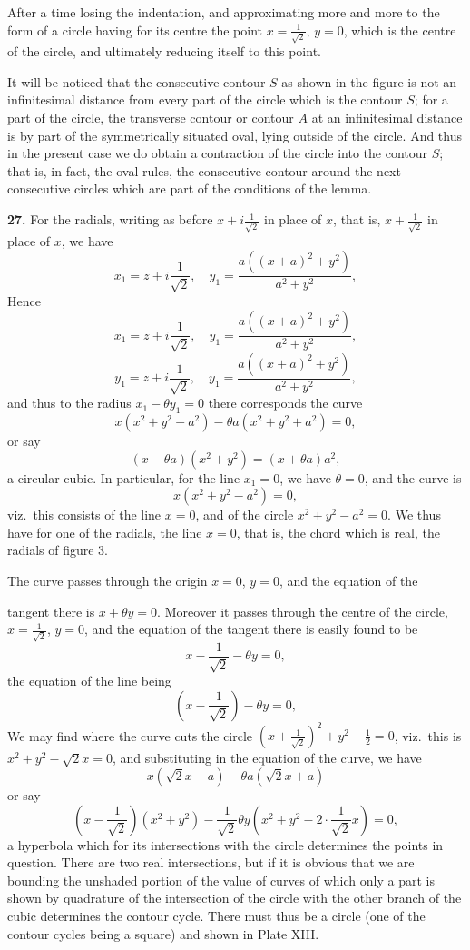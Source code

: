 \documentclass[11pt,a4paper]{article}
\begin{document}
After a time losing the indentation, and approximating more and more to the form of a circle having for its centre the point $x = \frac{1}{\sqrt{2}}$, $y = 0$, which is the centre of the circle, and ultimately reducing itself to this point.

It will be noticed that the consecutive contour $S$ as shown in the figure is not an infinitesimal distance from every part of the circle which is the contour $S$; for a part of the circle, the transverse contour or contour $A$ at an infinitesimal distance is by part of the symmetrically situated oval, lying outside of the circle. And thus in the present case we do obtain a contraction of the circle into the contour $S$; that is, in fact, the oval rules, the consecutive contour around the next consecutive circles which are part of the conditions of the lemma.

\textbf{27.} For the radials, writing as before $x + i \frac{1}{\sqrt{2}}$ in place of $x$, that is, $x + \frac{1}{\sqrt{2}}$ in place of $x$, we have
\[
x_1 = z + i \frac{1}{\sqrt{2}}, \quad y_1 = \frac{a((x + a)^2 + y^2)}{a^2 + y^2},
\]
Hence
\[
x_1 = z + i \frac{1}{\sqrt{2}}, \quad y_1 = \frac{a((x + a)^2 + y^2)}{a^2 + y^2},
\]
\[
y_1 = z + i \frac{1}{\sqrt{2}}, \quad y_1 = \frac{a((x + a)^2 + y^2)}{a^2 + y^2},
\]
and thus to the radius $x_1 - \theta y_1 = 0$ there corresponds the curve
\[
x(x^2 + y^2 - a^2) - \theta a(x^2 + y^2 + a^2) = 0,
\]
or say
\[
(x - \theta a)(x^2 + y^2) = (x + \theta a) a^2,
\]
a circular cubic. In particular, for the line $x_1 = 0$, we have $\theta = 0$, and the curve is
\[
x(x^2 + y^2 - a^2) = 0,
\]
viz.\ this consists of the line $x = 0$, and of the circle $x^2 + y^2 - a^2 = 0$. We thus have for one of the radials, the line $x = 0$, that is, the chord which is real, the radials of figure 3.

The curve passes through the origin $x = 0$, $y = 0$, and the equation of the

tangent there is $x + \theta y = 0$. Moreover it passes through the centre of the circle, $x = \frac{1}{\sqrt{2}}$, $y = 0$, and the equation of the tangent there is easily found to be
\[
x - \frac{1}{\sqrt{2}} - \theta y = 0,
\]
the equation of the line being
\[
\left(x - \frac{1}{\sqrt{2}}\right) - \theta y = 0,
\]
We may find where the curve cuts the circle $\left(x + \frac{1}{\sqrt{2}}\right)^2 + y^2 - \frac{1}{2} = 0$, viz.\ this is $x^2 + y^2 - \sqrt{2}x = 0$, and substituting in the equation of the curve, we have
\[
x(\sqrt{2}x - a) - \theta a(\sqrt{2}x + a)
\]
or say
\[
\left(x - \frac{1}{\sqrt{2}}\right)(x^2 + y^2) - \frac{1}{\sqrt{2}}\theta y(x^2 + y^2 - 2 \cdot \frac{1}{\sqrt{2}}x) = 0,
\]
a hyperbola which for its intersections with the circle determines the points in question. There are two real intersections, but if it is obvious that we are bounding the unshaded portion of the value of curves of which only a part is shown by quadrature of the intersection of the circle with the other branch of the cubic determines the contour cycle. There must thus be a circle (one of the contour cycles being a square) and shown in Plate XIII.
\end{document}
